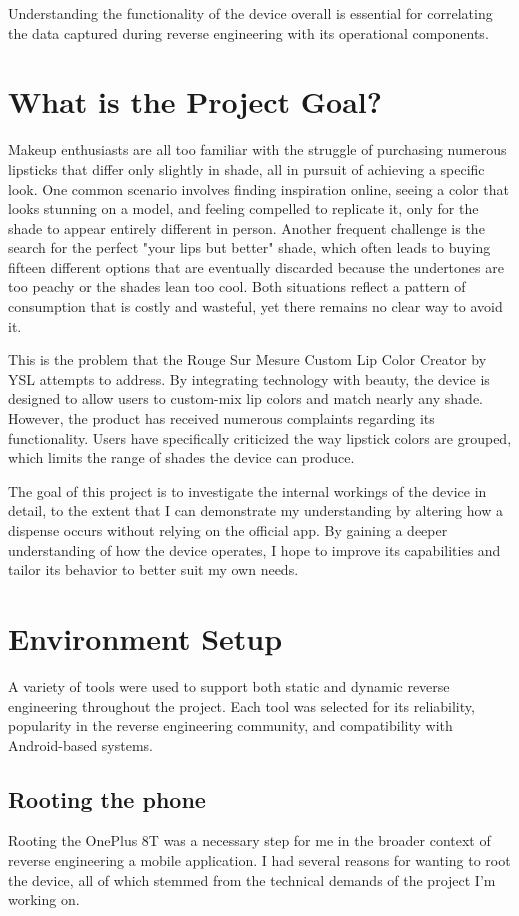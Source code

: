 Understanding the functionality of the device overall is essential for correlating the data captured during reverse engineering with its operational components.

\section{What is the Project Goal?}

Makeup enthusiasts are all too familiar with the struggle of purchasing numerous lipsticks that differ only slightly in shade, all in pursuit of achieving a specific look. One common scenario involves finding inspiration online, seeing a color that looks stunning on a model, and feeling compelled to replicate it, only for the shade to appear entirely different in person. Another frequent challenge is the search for the perfect "your lips but better" shade, which often leads to buying fifteen different options that are eventually discarded because the undertones are too peachy or the shades lean too cool. Both situations reflect a pattern of consumption that is costly and wasteful, yet there remains no clear way to avoid it.

This is the problem that the Rouge Sur Mesure Custom Lip Color Creator by YSL attempts to address. By integrating technology with beauty, the device is designed to allow users to custom-mix lip colors and match nearly any shade. However, the product has received numerous complaints regarding its functionality. Users have specifically criticized the way lipstick colors are grouped, which limits the range of shades the device can produce.

The goal of this project is to investigate the internal workings of the device in detail, to the extent that I can demonstrate my understanding by altering how a dispense occurs without relying on the official app. By gaining a deeper understanding of how the device operates, I hope to improve its capabilities and tailor its behavior to better suit my own needs.


\section{Environment Setup}
A variety of tools were used to support both static and dynamic reverse engineering 
throughout the project. Each tool was selected for its reliability, popularity in the reverse engineering community, and compatibility with Android-based systems.


\subsection{Rooting the phone}
Rooting the OnePlus 8T was a necessary step for me in the broader context of reverse engineering a mobile application. I had several reasons for wanting to root the device, all of which stemmed from the technical demands of the project I’m working on.

